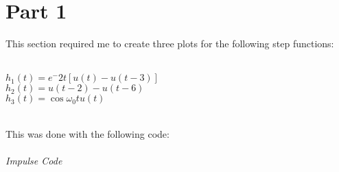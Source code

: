 \documentclass[12pt,a4paper]{article}
\begin{document}
\section{Part 1}\label{sec:intro}
This section required me to create three plots for the following step functions:\\
\\
\begin{center}
$h_1 (t) = e^-2t [u(t) - u(t-3)]$\\
$h_2 (t) = u(t-2)-u(t-6)$\\
$h_3 (t) = \cos{\omega_0 t} u(t)$\\
\end{center}
\\
This was done with the following code:\\
\\
\textit{Impulse Code}
\end{document}
